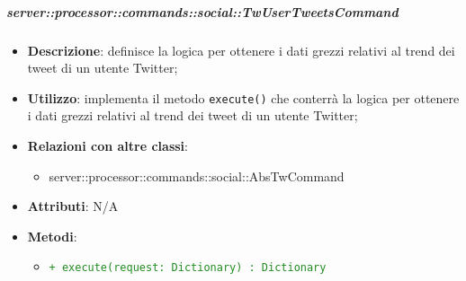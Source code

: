         \subparagraph{server::processor::commands::social::TwUserTweetsCommand} %
        \label{subp:bdsm_app_server_processor_commands_social_twcommand}
        \begin{itemize}
          \item \textbf{Descrizione}: definisce la logica per ottenere i dati grezzi relativi al trend dei tweet di un utente Twitter;
          \item \textbf{Utilizzo}: implementa il metodo \texttt{execute()} che conterrà la logica per ottenere i dati grezzi relativi al trend dei tweet di un utente Twitter;
          \item \textbf{Relazioni con altre classi}:
            \begin{itemize}
              \item server::processor::commands::social::AbsTwCommand
            \end{itemize}
          \item \textbf{Attributi}: N/A
          \item \textbf{Metodi}:
          \begin{itemize}
              \item \textcolor{forestgreen}{\texttt{+ execute(request: Dictionary) : Dictionary}}
          \end{itemize}
        \end{itemize}

